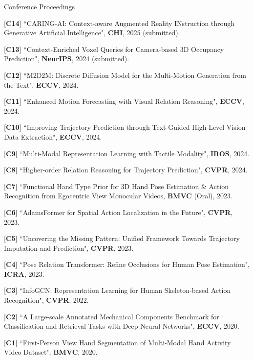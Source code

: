 


\begin{cventries}
\cvpub
{Conference Proceedings} %
{ %
\begin{cvitems}
    \item {[\textbf{C14}] ``CARING-AI: Context-aware Augmented Reality INstruction through Generative Artificial Intelligence", \textbf{CHI}, 2025 (submitted).}
    \item {[\textbf{C13}] ``Context-Enriched Voxel Queries for Camera-based 3D Occupancy Prediction", \textbf{NeurIPS}, 2024 (submitted).}
    \item {[\textbf{C12}] ``M2D2M: Discrete Diffusion Model for the Multi-Motion Generation from the Text", \textbf{ECCV}, 2024.}
    \item {[\textbf{C11}] ``Enhanced Motion Forecasting with Visual Relation Reasoning", \textbf{ECCV}, 2024.}
    \item {[\textbf{C10}] ``Improving Trajectory Prediction through Text-Guided High-Level Vision Data Extraction", \textbf{ECCV}, 2024.}
    \item {[\textbf{C9}] ``Multi-Modal Representation Learning with Tactile Modality", \textbf{IROS}, 2024.}
    \item {[\textbf{C8}] ``Higher-order Relation Reasoning for Trajectory Prediction", \textbf{CVPR}, 2024.}
    \item {[\textbf{C7}] ``Functional Hand Type Prior for 3D Hand Pose Estimation \& Action Recognition from Egocentric View Monocular Videos, \textbf{BMVC} (Oral), 2023.}
    \item {[\textbf{C6}] ``AdamsFormer for Spatial Action Localization in the Future", \textbf{CVPR}, 2023.}
    \item {[\textbf{C5}] ``Uncovering the Missing Pattern: Unified Framework Towards Trajectory Imputation and Prediction", \textbf{CVPR}, 2023.}
    \item {[\textbf{C4}] ``Pose Relation Transformer: Refine Occlusions for Human Pose Estimation", \textbf{ICRA}, 2023.}
    \item {[\textbf{C3}] ``InfoGCN: Representation Learning for Human Skeleton-based Action Recognition", \textbf{CVPR}, 2022.}
    \item {[\textbf{C2}] ``A Large-scale Annotated Mechanical Components Benchmark for Classification and Retrieval Tasks with Deep Neural Networks", \textbf{ECCV}, 2020.}
    \item {[\textbf{C1}] ``First-Person View Hand Segmentation of Multi-Modal Hand Activity Video Dataset", \textbf{BMVC}, 2020.}
\end{cvitems}
}



\end{cventries}
